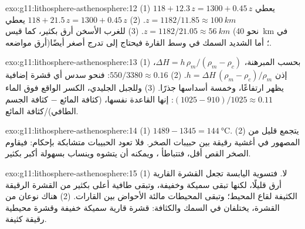 \begin{solution}{exo:g11:lithosphere-asthenosphere:12}
(1) $118 + 12.3\,z = 1300 + 0.45\,z$ يعطي $z = 1182/11.85 \approx
\qty{100}{km}$. (2) $118 + 21.5\,z = 1300 + 0.45\,z$ يعطي $z = 1182/21.05
\approx \qty{56}{km}$. (3) للغرب الأسخن  أرق بكثير،
كما قيس (نحو \qty{40}{km} في أرق مواضعه)؛ أما  الشديد السمك
في وسط القارة فيحتاج إلى تدرج أصغر أيضًا.
\end{solution}

\begin{solution}{exo:g11:lithosphere-asthenosphere:13}
(1) بحسب المبرهنة، $\Delta H = h\,\rho_m/(\rho_m - \rho_c)$، إذن $h =
\Delta H\,(\rho_m - \rho_c)/\rho_m$. (2) $550/3380 \approx 0.16$: فنحو
سدس أي قشرة إضافية يظهر ارتفاعًا، وخمسة أسداسها جذرًا. (3) وللجبل
الجليدي، الكسر الواقع فوق الماء $(1025 - 910)/1025 \approx 0.11$:
إنها القاعدة نفسها، (كثافة المائع $-$ كثافة الجسم الطافي)/كثافة
المائع.
\end{solution}

\begin{solution}{exo:g11:lithosphere-asthenosphere:14}
(1) $1489 - 1345 = \qty{144}{\celsius}$. (2) يتجمع قليل من المصهور في
أغشية رقيقة بين حبيبات الصخر. فلا تعود الحبيبات متشابكة
بإحكام: فيقاوم الصخر القص أقل، فتتباطأ ، ويمكنه
أن يتشوه وينساب بسهولة أكبر بكثير.
\end{solution}

\begin{solution}{exo:g11:lithosphere-asthenosphere:15}
(1) لا. فتسوية اليابسة تجعل القشرة القارية أرق قليلًا،
لكنها تبقى سميكة وخفيفة، وتبقى طافية أعلى بكثير من
القشرة الرقيقة الكثيفة لقاع المحيط؛ وتبقى المحيطات مالئة
الأحواض بين القارات. (2) هناك نوعان من القشرة، يختلفان في
السمك والكثافة: قشرة قارية سميكة خفيفة وقشرة محيطية رقيقة
كثيفة.
\end{solution}

